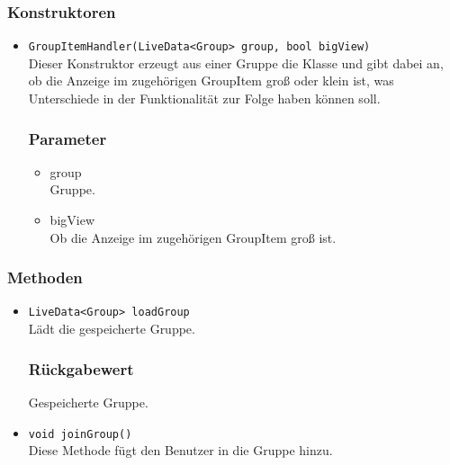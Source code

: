\documentclass[a4paper]{scrreprt}
\begin{document}
\subsubsection*{Konstruktoren}
\begin{addmargin}[25pt]{0pt}
\begin{itemize}

\item \texttt{GroupItemHandler(LiveData<Group> group, bool bigView)}\\
	Dieser Konstruktor erzeugt aus einer Gruppe die Klasse und gibt dabei an, ob die Anzeige im zugehörigen GroupItem groß oder klein ist, was Unterschiede in der Funktionalität zur Folge haben können soll. 

	\subsubsection*{Parameter}
	\begin{itemize}
	\item group \\
		Gruppe.
	\item bigView \\
		Ob die Anzeige im zugehörigen GroupItem groß ist. 
	\end{itemize}

\end{itemize}
\end{addmargin}

\subsubsection*{Methoden}
\begin{addmargin}[25pt]{0pt}
\begin{itemize}

\item \texttt{LiveData<Group> loadGroup}\\
	Lädt die gespeicherte Gruppe.

	\subsubsection*{Rückgabewert}
	Gespeicherte Gruppe.

\item \texttt{void joinGroup()}\\
	Diese Methode fügt den Benutzer in die Gruppe hinzu.

\end{itemize}
\end{addmargin}
\end{document}
